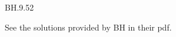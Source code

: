

\setcounter{theorem}{51}
\begin{exercise} BH.9.52
\begin{solution}
See the solutions provided by BH in their pdf.

\end{solution}
\end{exercise}



